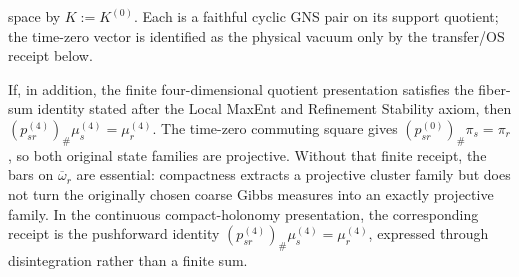\begin{proposition}
\begin{enumerate}[label=\textup{(\roman*)},leftmargin=2em]
space by \(K:=K^{(0)}\). Each is a faithful cyclic GNS pair on its support quotient; the
time-zero vector is identified as the physical vacuum only by the transfer/OS receipt below.
\end{enumerate}
If, in addition, the finite four-dimensional quotient presentation satisfies the fiber-sum
identity stated after the Local MaxEnt and Refinement Stability axiom, then
\((p_{sr}^{(4)})_\#\mu_s^{(4)}=\mu_r^{(4)}\). The time-zero commuting square gives
\((p_{sr}^{(0)})_\#\pi_s=\pi_r\), so both original state families are projective. Without that
finite receipt, the bars on
\(\overline\omega_r\) are essential: compactness extracts a projective cluster family but does
not turn the originally chosen coarse Gibbs measures into an exactly projective family. In the
continuous compact-holonomy presentation, the corresponding receipt is the pushforward identity
\((p_{sr}^{(4)})_\#\mu_s^{(4)}=\mu_r^{(4)}\), expressed through disintegration rather than a
finite sum.
\end{proposition}

